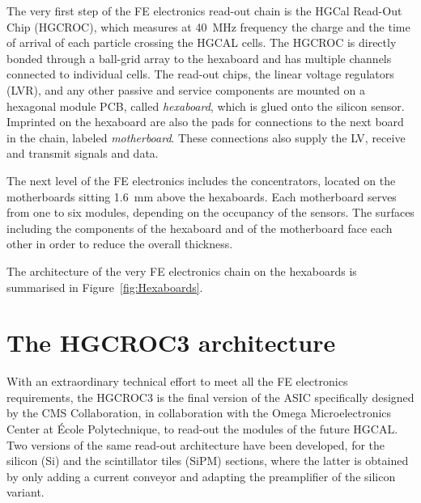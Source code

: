 \bigbreak

The very first step of the FE electronics read-out chain is the HGCal Read-Out Chip (HGCROC), which measures at 40~MHz frequency the charge and the time of arrival of each particle crossing the HGCAL cells. The HGCROC is directly bonded through a ball-grid array to the hexaboard and has multiple channels connected to individual cells. 
The read-out chips, the linear voltage regulators (LVR), and any other passive and service components are mounted on a hexagonal module PCB, called \textit{hexaboard}, which is glued onto the silicon sensor. Imprinted on the hexaboard are also the pads for connections to the next board in the chain, labeled \textit{motherboard}. These connections also supply the LV, receive and transmit signals and data. 

\bigbreak

The next level of the FE electronics includes the concentrators, located on the motherboards sitting 1.6~mm above the hexaboards. Each motherboard serves from one to six modules, depending on the occupancy of the sensors. The surfaces including the components of the hexaboard and of the motherboard face each other in order to reduce the overall thickness. 

The architecture of the very FE electronics chain on the hexaboards is summarised in Figure~\ref{fig:Hexaboards}. 


\section{The HGCROC3 architecture}
\label{sec:The HGCROC3 architecture}

With an extraordinary technical effort to meet all the FE electronics requirements, the HGCROC3 is the final version of the ASIC specifically designed by the CMS Collaboration, in collaboration with the Omega Microelectronics Center at École Polytechnique, to read-out the modules of the future HGCAL. 
Two versions of the same read-out architecture have been developed, for the silicon (Si) and the scintillator tiles (SiPM) sections, where the latter is obtained by only adding a current conveyor and adapting the preamplifier of the silicon variant.

